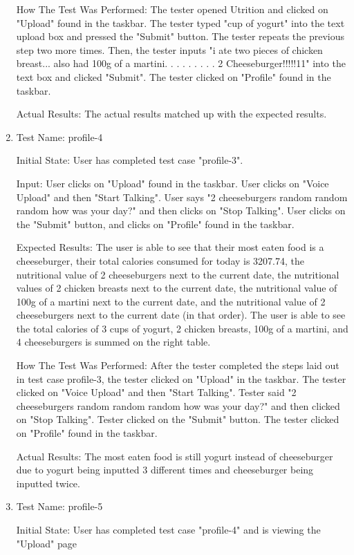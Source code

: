 \documentclass[12pt, titlepage]{article}
\begin{document}
\begin{enumerate}
		How The Test Was Performed: The tester opened Utrition and clicked on "Upload" found in the taskbar. The tester typed "cup of yogurt" into the text upload box and pressed the "Submit" button. The tester repeats the previous step two more times. Then, the tester inputs "i ate two pieces of chicken breast... also had 100g of a martini. . . . . . . . . 2 Cheeseburger!!!!!11" into the text box and clicked "Submit". The tester clicked on "Profile" found in the taskbar.
		
		Actual Results: The actual results matched up with the expected results.
		
		\item{Test Name: profile-4}
		
		Initial State: User has completed test case "profile-3".
		
		Input: User clicks on "Upload" found in the taskbar. User clicks on "Voice Upload" and then "Start Talking". User says "2 cheeseburgers random random random how was your day?" and then clicks on "Stop Talking". User clicks on the "Submit" button, and clicks on "Profile" found in the taskbar.
		
		Expected Results: The user is able to see that their most eaten food is a cheeseburger, their total calories consumed for today is 3207.74, the nutritional value of 2 cheeseburgers next to the current date, the nutritional values of 2 chicken breasts next to the current date, the nutritional value of 100g of a martini next to the current date, and the nutritional value of 2 cheeseburgers next to the current date (in that order). The user is able to see the total calories of 3 cups of yogurt, 2 chicken breasts, 100g of a martini, and 4 cheeseburgers is summed on the right table.
		
		How The Test Was Performed: After the tester completed the steps laid out in test case profile-3, the tester clicked on "Upload" in the taskbar. The tester clicked on "Voice Upload" and then "Start Talking". Tester said "2 cheeseburgers random random random how was your day?" and then clicked on "Stop Talking". Tester clicked on the "Submit" button. The tester clicked on "Profile" found in the taskbar.
		
		Actual Results: The most eaten food is still yogurt instead of cheeseburger due to yogurt being inputted 3 different times and cheeseburger being inputted twice.
		
		\item{Test Name: profile-5}
		
		Initial State: User has completed test case "profile-4" and is viewing the "Upload" page
		

\end{enumerate}
\end{document}
